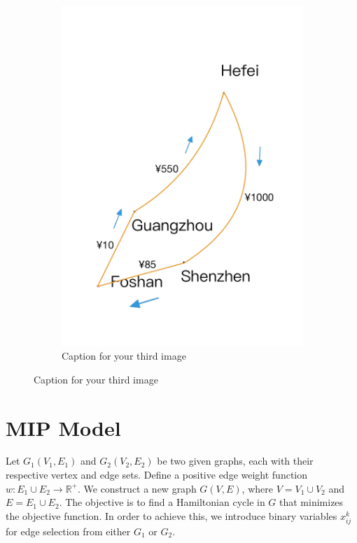 \documentclass{extarticle}
\begin{document}
\begin{figure}[!ht]
\begin{subfigure}{0.3\textwidth}
      \includegraphics[width=\textwidth]{pic/3.png}
      \caption{Caption for your third image}%
\label{fig:your_image3}
  \end{subfigure}%
\end{figure}
\section{MIP Model}
Let $G_1(V_1, E_1)$ and $G_2(V_2, E_2)$ be two given graphs, each with their
respective vertex and edge sets. Define a positive edge weight function $w :
  E_1 \cup E_2 \rightarrow \mathbb{R}^+$. We construct a new graph $G(V, E)$,
where $V = V_1 \cup V_2$ and $E = E_1 \cup E_2$. The objective is to find a
Hamiltonian cycle in $G$ that minimizes the objective function. In order to
achieve this, we introduce binary variables $x_{ij}^k$ for edge selection from
either $G_1$ or $G_2$.
\end{document}
